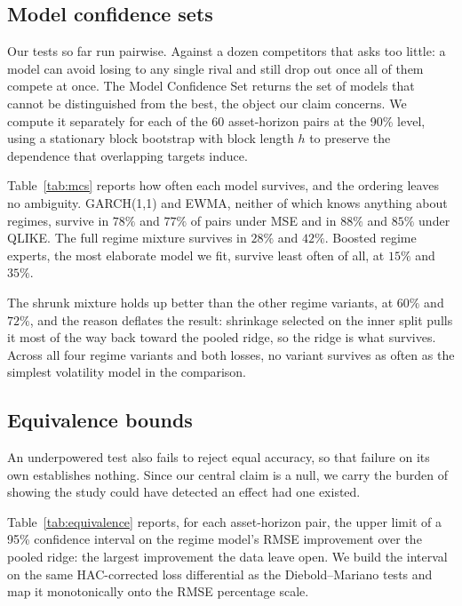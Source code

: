 \documentclass[sigconf,nonacm]{acmart}
\begin{document}
\subsection{Model confidence sets}
\label{sec:mcs}



Our tests so far run pairwise. Against a dozen competitors that asks too little:
a model can avoid losing to any single rival and still drop out once all of them
compete at once. The Model Confidence Set \cite{hansen2011mcs} returns the set of
models that cannot be distinguished from the best, the object our claim concerns.
We compute it separately for each of the 60 asset-horizon pairs at the 90\%
level, using a stationary block bootstrap \cite{politis1994} with block length
$h$ to preserve the dependence that overlapping targets induce.

Table~\ref{tab:mcs} reports how often each model survives, and the ordering
leaves no ambiguity. GARCH(1,1) and EWMA, neither of which knows anything about
regimes, survive in $78\%$ and $77\%$ of pairs under MSE and in $88\%$ and $85\%$
under QLIKE. The full regime mixture survives in $28\%$ and $42\%$. Boosted regime
experts, the most elaborate model we fit, survive least often of all, at $15\%$
and $35\%$.

The shrunk mixture holds up better than the other regime variants, at $60\%$ and
$72\%$, and the reason deflates the result: shrinkage selected on the inner split
pulls it most of the way back toward the pooled ridge, so the ridge is what
survives. Across all four regime variants and both losses, no variant survives as
often as the simplest volatility model in the comparison.

\subsection{Equivalence bounds}
\label{sec:equivalence}



An underpowered test also fails to reject equal accuracy, so that failure on its
own establishes nothing. Since our central claim is a null, we carry the burden of
showing the study could have detected an effect had one existed.

Table~\ref{tab:equivalence} reports, for each asset-horizon pair, the upper limit
of a 95\% confidence interval on the regime model's RMSE improvement over the
pooled ridge: the largest improvement the data leave open. We build the interval
on the same HAC-corrected loss differential as the Diebold--Mariano tests and map
it monotonically onto the RMSE percentage scale.
\end{document}
